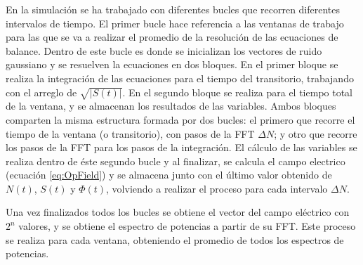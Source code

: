 		En la simulaci\'on se ha trabajado con diferentes bucles que recorren diferentes intervalos de tiempo. El primer bucle hace referencia a las ventanas de trabajo para las que se va a realizar el promedio de la resoluci\'on de las ecuaciones de balance. Dentro de este bucle es donde se inicializan los vectores de ruido gaussiano y se resuelven la ecuaciones en dos bloques. En el primer bloque se realiza la integraci\'on de las ecuaciones para el tiempo del transitorio, trabajando con el arreglo de $\sqrt{|S(t)|}$. En el segundo bloque se realiza para el tiempo total de la ventana, y se almacenan los resultados de las variables. Ambos bloques comparten la misma estructura formada por dos bucles: el primero que recorre el tiempo de la ventana (o transitorio), con pasos de la FFT $\Delta N$; y otro que recorre los pasos de la FFT para los pasos de la integraci\'on. El c\'alculo de las variables se realiza dentro de \'este segundo bucle y al finalizar, se calcula el campo electrico (ecuaci\'on \ref{eq:OpField}) y se almacena junto con el \'ultimo valor obtenido de $N(t)$, $S(t)$ y $\Phi(t)$, volviendo a realizar el proceso para cada intervalo $\Delta N$. 

		Una vez finalizados todos los bucles se obtiene el vector del campo el\'ectrico con $2^n$ valores, y se obtiene el espectro de potencias a partir de su FFT. Este proceso se realiza para cada ventana, obteniendo el promedio de todos los espectros de potencias.
